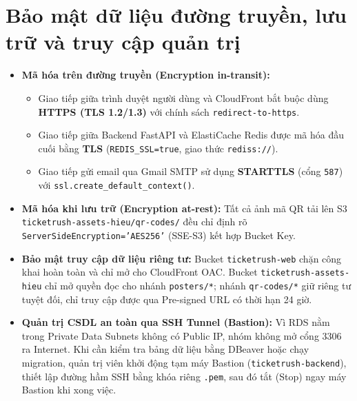 \section{Bảo mật dữ liệu đường truyền, lưu trữ và truy cập quản trị}
\begin{itemize}[leftmargin=1.5em]
  \item \textbf{Mã hóa trên đường truyền (Encryption in-transit):}
    \begin{itemize}[leftmargin=1.2em]
      \item Giao tiếp giữa trình duyệt người dùng và CloudFront bắt buộc dùng \textbf{HTTPS (TLS 1.2/1.3)} với chính sách \texttt{redirect-to-https}.
      \item Giao tiếp giữa Backend FastAPI và ElastiCache Redis được mã hóa đầu cuối bằng \textbf{TLS} (\texttt{REDIS\_SSL=true}, giao thức \texttt{rediss://}).
      \item Giao tiếp gửi email qua Gmail SMTP sử dụng \textbf{STARTTLS} (cổng \texttt{587}) với \texttt{ssl.create\_default\_context()}.
    \end{itemize}
  \item \textbf{Mã hóa khi lưu trữ (Encryption at-rest):}
    Tất cả ảnh mã QR tải lên S3 \texttt{ticketrush-assets-hieu/qr-codes/} đều chỉ định rõ \texttt{ServerSideEncryption='AES256'} (SSE-S3) kết hợp Bucket Key.
  \item \textbf{Bảo mật truy cập dữ liệu riêng tư:}
    Bucket \texttt{ticketrush-web} chặn công khai hoàn toàn và chỉ mở cho CloudFront OAC. Bucket \texttt{ticketrush-assets-hieu} chỉ mở quyền đọc cho nhánh \texttt{posters/*}; nhánh \texttt{qr-codes/*} giữ riêng tư tuyệt đối, chỉ truy cập được qua Pre-signed URL có thời hạn 24 giờ.
  \item \textbf{Quản trị CSDL an toàn qua SSH Tunnel (Bastion):}
    Vì RDS nằm trong Private Data Subnets không có Public IP, nhóm không mở cổng 3306 ra Internet. Khi cần kiểm tra bảng dữ liệu bằng DBeaver hoặc chạy migration, quản trị viên khởi động tạm máy Bastion (\texttt{ticketrush-backend}), thiết lập đường hầm SSH bằng khóa riêng \texttt{.pem}, sau đó tắt (Stop) ngay máy Bastion khi xong việc.
\end{itemize}

